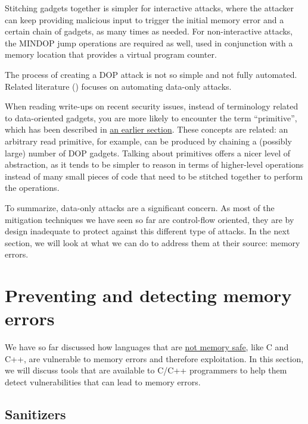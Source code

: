 \documentclass[
  a4paper,
]{report}
\begin{document}
Stitching gadgets together is simpler for interactive attacks, where the
attacker can keep providing malicious input to trigger the initial
memory error and a certain chain of gadgets, as many times as needed.
For non-interactive attacks, the MINDOP jump operations are required as
well, used in conjunction with a memory location that provides a virtual
program counter.

The process of creating a DOP attack is not so simple and not fully
automated. Related literature () focuses on automating data-only attacks.

When reading write-ups on recent security issues, instead of terminology
related to data-oriented gadgets, you are more likely to encounter the
term ``primitive'', which has been described in
\hyperref[exploitation-primitives]{an earlier section}. These concepts
are related: an arbitrary read primitive, for example, can be produced
by chaining a (possibly large) number of DOP gadgets. Talking about
primitives offers a nicer level of abstraction, as it tends to be
simpler to reason in terms of higher-level operations instead of many
small pieces of code that need to be stitched together to perform the
operations.

To summarize, data-only attacks are a significant concern. As most of
the mitigation techniques we have seen so far are control-flow oriented,
they are by design inadequate to protect against this different type of
attacks. In the next section, we will look at what we can do to address
them at their source: memory errors.

\section{Preventing and detecting memory
errors}\label{sec:preventing-and-detecting-memory-errors}

We have so far discussed how languages that are
\hyperref[a-bit-of-background-on-memory-vulnerabilities]{not memory
safe}, like C and C++, are vulnerable to memory errors and therefore
exploitation. In this section, we will discuss tools that are available
to
\label{__index_entry_63}{C}/\label{__index_entry_64}{C++}
programmers to help them detect vulnerabilities that can lead to memory
errors.

\subsection{Sanitizers}\label{sanitizers}
\end{document}
